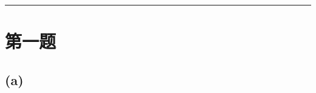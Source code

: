 \documentclass[11pt,a4paper,fontset=fandol]{ctexart}
\newcommand{\StudentName}{}
\newcommand{\StudentID}{}
\newcommand{\SubmissionDate}{}
\newcommand{\heading}[1]{\subsection*{#1}}
\begin{document}
\noindent{\small\StudentName\quad\StudentID\hfill\SubmissionDate}\par
\vspace{2mm}\hrule\vspace{3mm}
\section*{第一题}
\heading{(a)}
\end{document}
